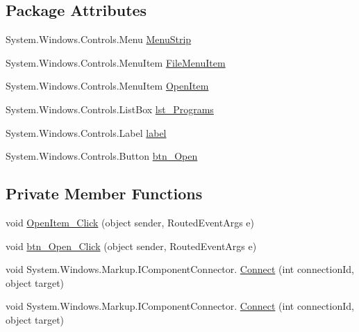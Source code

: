 \subsection*{Package Attributes}
\begin{DoxyCompactItemize}
\item 
System.\+Windows.\+Controls.\+Menu \hyperlink{class_c_p_u___o_s___simulator_1_1_save___file___editor_1_1_main_window_ad7217e9c5af484ec701b1f9ffdedb38d}{Menu\+Strip}
\item 
System.\+Windows.\+Controls.\+Menu\+Item \hyperlink{class_c_p_u___o_s___simulator_1_1_save___file___editor_1_1_main_window_af4c6dfeaa4a5e61edfc6999c20789e51}{File\+Menu\+Item}
\item 
System.\+Windows.\+Controls.\+Menu\+Item \hyperlink{class_c_p_u___o_s___simulator_1_1_save___file___editor_1_1_main_window_aebf8cad0b5c0d104ce4c458034e3422f}{Open\+Item}
\item 
System.\+Windows.\+Controls.\+List\+Box \hyperlink{class_c_p_u___o_s___simulator_1_1_save___file___editor_1_1_main_window_af63f60251391d783dcb3cab281076e38}{lst\+\_\+\+Programs}
\item 
System.\+Windows.\+Controls.\+Label \hyperlink{class_c_p_u___o_s___simulator_1_1_save___file___editor_1_1_main_window_ac0c64a25031b8c702364d92553ae98a7}{label}
\item 
System.\+Windows.\+Controls.\+Button \hyperlink{class_c_p_u___o_s___simulator_1_1_save___file___editor_1_1_main_window_a353c2ed525a145ca1034f96605ffeb73}{btn\+\_\+\+Open}
\end{DoxyCompactItemize}
\subsection*{Private Member Functions}
\begin{DoxyCompactItemize}
\item 
void \hyperlink{class_c_p_u___o_s___simulator_1_1_save___file___editor_1_1_main_window_a84d08af3d9741cbfdaca05f983b59dce}{Open\+Item\+\_\+\+Click} (object sender, Routed\+Event\+Args e)
\item 
void \hyperlink{class_c_p_u___o_s___simulator_1_1_save___file___editor_1_1_main_window_a08c423d1a581ed53061d54fe7bed1970}{btn\+\_\+\+Open\+\_\+\+Click} (object sender, Routed\+Event\+Args e)
\item 
void System.\+Windows.\+Markup.\+I\+Component\+Connector. \hyperlink{class_c_p_u___o_s___simulator_1_1_save___file___editor_1_1_main_window_ac7273f5cbb0c6d3d0d50b763cff3e68e}{Connect} (int connection\+Id, object target)
\item 
void System.\+Windows.\+Markup.\+I\+Component\+Connector. \hyperlink{class_c_p_u___o_s___simulator_1_1_save___file___editor_1_1_main_window_ac7273f5cbb0c6d3d0d50b763cff3e68e}{Connect} (int connection\+Id, object target)
\end{DoxyCompactItemize}
